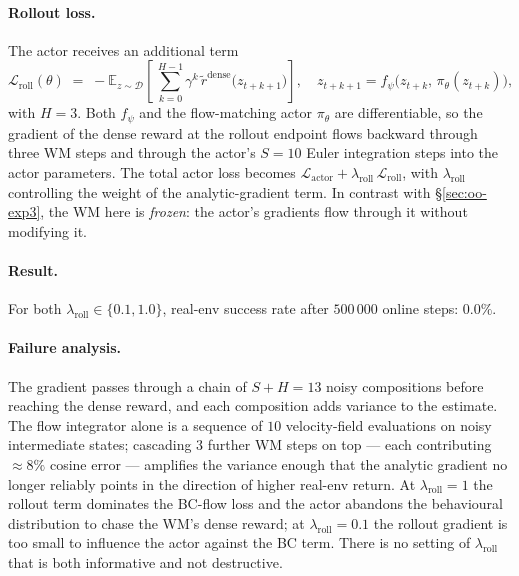 \paragraph{Rollout loss.} The actor receives an additional term
\begin{equation}
    \mathcal{L}_{\text{roll}}(\theta) \;=\;
        -\mathbb{E}_{z\sim\mathcal{D}}\!\left[\,\sum_{k=0}^{H-1}\gamma^{k}\,
            \tilde r^{\text{dense}}\!\big(z_{t+k+1}\big)\right],
    \quad
    z_{t+k+1} = f_\psi\!\big(z_{t+k},\,\pi_\theta(z_{t+k})\big),
    \label{eq:oo-rollout-loss}
\end{equation}
with $H = 3$. Both $f_\psi$ and the flow-matching actor $\pi_\theta$ are differentiable, so the gradient of the dense reward at the rollout endpoint flows backward through three WM steps and through the actor's $S = 10$ Euler integration steps into the actor parameters. The total actor loss becomes $\mathcal{L}_{\text{actor}} + \lambda_{\text{roll}}\,\mathcal{L}_{\text{roll}}$, with $\lambda_{\text{roll}}$ controlling the weight of the analytic-gradient term. In contrast with \S\ref{sec:oo-exp3}, the WM here is \emph{frozen}: the actor's gradients flow through it without modifying it.

\paragraph{Result.} For both $\lambda_{\text{roll}} \in \{0.1, 1.0\}$, real-env success rate after $500\,000$ online steps: $0.0\%$.

\paragraph{Failure analysis.} The gradient passes through a chain of $S + H = 13$ noisy compositions before reaching the dense reward, and each composition adds variance to the estimate. The flow integrator alone is a sequence of $10$ velocity-field evaluations on noisy intermediate states; cascading $3$ further WM steps on top --- each contributing $\approx 8\%$ cosine error --- amplifies the variance enough that the analytic gradient no longer reliably points in the direction of higher real-env return. At $\lambda_{\text{roll}} = 1$ the rollout term dominates the BC-flow loss and the actor abandons the behavioural distribution to chase the WM's dense reward; at $\lambda_{\text{roll}} = 0.1$ the rollout gradient is too small to influence the actor against the BC term. There is no setting of $\lambda_{\text{roll}}$ that is both informative and not destructive.

